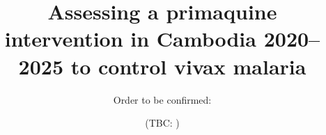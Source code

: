 \documentclass[doublespacing]{bmcart}
\begin{document}
\begin{frontmatter}

\begin{fmbox}


\title{Assessing a primaquine intervention in Cambodia 2020--2025 to control vivax malaria}


\author[
   addressref={melbms,melbph,bi},                   %
   email={r.hickson@UNSWalumni.com}   %
]{Order to be confirmed:  }
%
\author[
   addressref={bi},
   email={rowan.martin-hughes@burnet.edu.au}
]{ }
%
\author[
   addressref={menzies},
   email={angela.devine@menzies.edu.au}
]{ }
%
\author[
   addressref={melbph,doherty},
   email={david.price1@unimelb.edu.au}
]{ }
\author[
   addressref={bi},
   email={freya.fowkes@burnet.edu.au}
]{ }
%
\author[
   addressref={melbms,melbph,doherty},
   email={jamesm@unimelb.edu.au}
]{ }
%
\author[
   addressref={menzies},
   email={@menzies.edu.au}
]{(TBC:  )}
%
\author[
   addressref={melbph},
   email={julieas@unimelb.edu.au}
]{ }
%
\author[
   addressref={cnm},
   email={sivsovannaroths@gmail.com}
]{ }
%
\author[
   addressref={cnm,moru},
   email={pengby@email.com}
]{ }


\end{fmbox}
\end{frontmatter}
\end{document}
